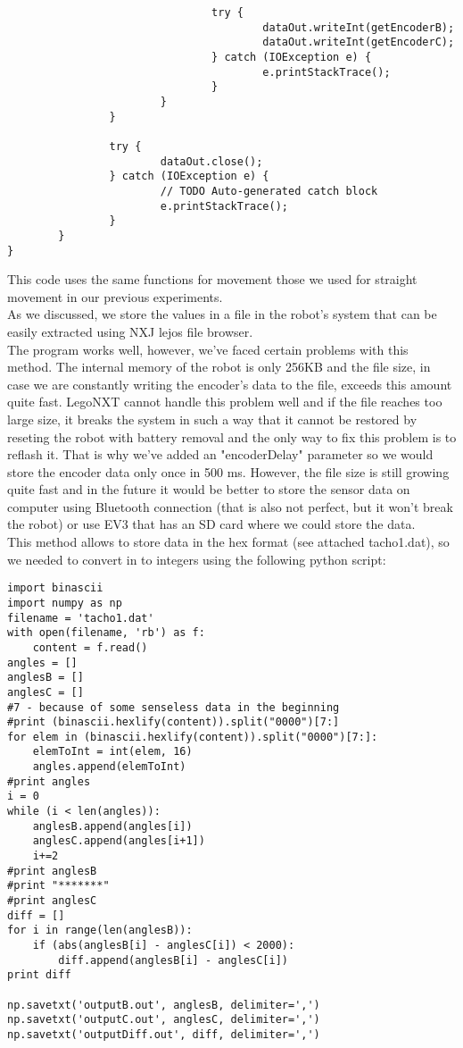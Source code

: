\documentclass[a4paper, 12pt]{article}
\begin{document}
\begin{lstlisting}
                                try {
                                        dataOut.writeInt(getEncoderB);
                                        dataOut.writeInt(getEncoderC);
                                } catch (IOException e) {
                                        e.printStackTrace();
                                }
                        }
                }

                try {
                        dataOut.close();
                } catch (IOException e) {
                        // TODO Auto-generated catch block
                        e.printStackTrace();
                }
        }
}
\end{lstlisting}

This code uses the same functions for movement those we used for straight movement in our previous experiments.\\

As we discussed, we store the values in a file in the robot's system that can be easily extracted using NXJ lejos file browser.\\

The program works well, however, we've faced certain problems with this method. The internal memory of the robot is only 256KB and the file size, in case we are constantly writing the encoder's data to the file, exceeds this amount quite fast. LegoNXT cannot handle this problem well and if the file reaches too large size, it breaks the system in such a way that it cannot be restored by reseting the robot with battery removal and the only way to fix this problem is to reflash it. That is why we've added an "encoderDelay" parameter so we would store the encoder data only once in 500 ms. However, the file size is still growing quite fast and in the future it would be better to store the sensor data on computer using Bluetooth connection (that is also not perfect, but it won't break the robot) or use EV3 that has an SD card where we could store the data.\\

This method allows to store data in the hex format (see attached tacho1.dat), so we needed to convert in to integers using the following python script:

\begin{lstlisting}
import binascii
import numpy as np
filename = 'tacho1.dat'
with open(filename, 'rb') as f:
    content = f.read()
angles = []
anglesB = []
anglesC = []
#7 - because of some senseless data in the beginning
#print (binascii.hexlify(content)).split("0000")[7:]
for elem in (binascii.hexlify(content)).split("0000")[7:]:
    elemToInt = int(elem, 16)
    angles.append(elemToInt)
#print angles
i = 0
while (i < len(angles)):
    anglesB.append(angles[i])
    anglesC.append(angles[i+1])
    i+=2
#print anglesB
#print "*******"
#print anglesC
diff = []
for i in range(len(anglesB)):
    if (abs(anglesB[i] - anglesC[i]) < 2000):
        diff.append(anglesB[i] - anglesC[i])
print diff

np.savetxt('outputB.out', anglesB, delimiter=',')
np.savetxt('outputC.out', anglesC, delimiter=',')
np.savetxt('outputDiff.out', diff, delimiter=',')
\end{lstlisting}
\end{document}
